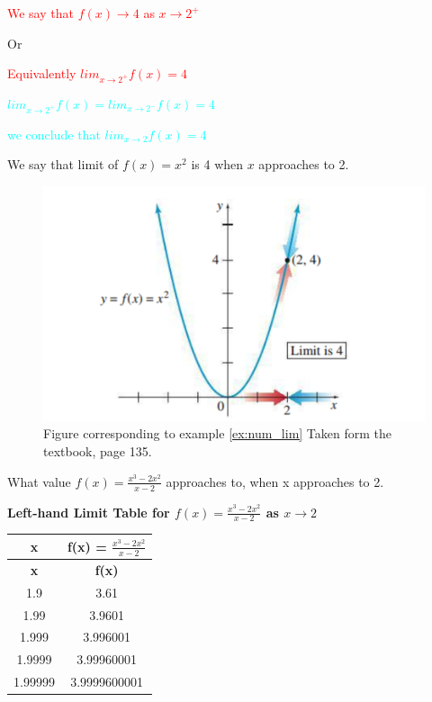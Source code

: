 \textcolor{red}{We say that $f(x) \to 4 $ as $x \to 2^{+}$}

Or

\textcolor{red}{Equivalently $ lim_{x \to 2^{+}}f(x) = 4$}  


\textcolor{cyan}{ $ lim_{x \to 2^{+}}f(x) = lim_{x \to 2^{-}}f(x) = 4$}  

\textcolor{cyan}{ we conclude that $ lim_{x \to 2}f(x) =  4$}  

We say that limit of $f(x)=x^{2}$ is 4 when $x$ approaches to 2.


\begin{figure}[H]
  \centering
  \includegraphics[scale=0.5]{"./fig/num_lim_exm_1.png"}
  \caption{\label{fig:fig_label} Figure corresponding to example \eqref{ex:num_lim} Taken form the textbook, page 135. }
\end{figure}


\begin{example}
  \label{ex:num_lim2}
What value  $f(x) = \frac{x^3 - 2x^2}{x - 2} $ approaches to, when x approaches to 2.

\end{example}
\textbf{Left-hand Limit Table for \( f(x) = \frac{x^3 - 2x^2}{x - 2} \) as \( x \to 2 \)}

\begin{longtable}{|c|c|}
\hline
\textbf{x} & \textbf{f(x) = \( \frac{x^3 - 2x^2}{x - 2} \)} \\
\hline
\endfirsthead
\hline
\textbf{x} & \textbf{f(x)} \\
\hline
\endhead
1.9 & 3.61 \\
\hline
1.99 & 3.9601 \\
\hline
1.999 & 3.996001 \\
\hline
1.9999 & 3.99960001 \\
\hline
1.99999 & 3.9999600001 \\
\hline
\end{longtable}

